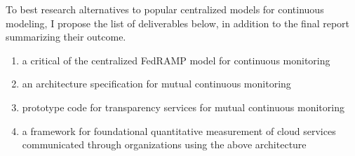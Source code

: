 \documentclass{jdf}
\begin{document}
To best research alternatives to popular centralized models for continuous modeling, I propose the list of deliverables below, in addition to the final report summarizing their outcome. 

\begin{enumerate}
    \item a critical of the centralized FedRAMP model for continuous monitoring
    \item an architecture specification for mutual continuous monitoring
    \item prototype code for transparency services for mutual continuous monitoring
    \item a framework for foundational quantitative measurement of cloud services communicated through organizations using the above architecture
\end{enumerate}
\end{document}
